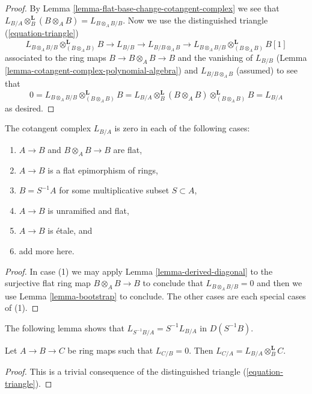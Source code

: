 \begin{proof}
By Lemma \ref{lemma-flat-base-change-cotangent-complex} we see that
$L_{B/A} \otimes_B^\mathbf{L} (B \otimes_A B) = L_{B \otimes_A B/B}$.
Now we use the distinguished triangle (\ref{equation-triangle})
$$
L_{B \otimes_A B/B} \otimes^\mathbf{L}_{(B \otimes_A B)} B \to
L_{B/B} \to L_{B/B \otimes_A B} \to
L_{B \otimes_A B/B} \otimes^\mathbf{L}_{(B \otimes_A B)} B[1]
$$
associated to the ring maps $B \to B \otimes_A B \to B$ and the vanishing of
$L_{B/B}$ (Lemma \ref{lemma-cotangent-complex-polynomial-algebra}) and
$L_{B/B \otimes_A B}$ (assumed) to see that
$$
0 =
L_{B \otimes_A B/B} \otimes^\mathbf{L}_{(B \otimes_A B)} B =
L_{B/A} \otimes_B^\mathbf{L} (B \otimes_A B)
\otimes^\mathbf{L}_{(B \otimes_A B)} B = L_{B/A}
$$
as desired.
\end{proof}

\begin{lemma}
\label{lemma-when-zero}
The cotangent complex $L_{B/A}$ is zero in each of the following cases:
\begin{enumerate}
\item $A \to B$ and $B \otimes_A B \to B$ are flat,
\item $A \to B$ is a flat epimorphism of rings,
\item $B = S^{-1}A$ for some multiplicative subset $S \subset A$,
\item $A \to B$ is unramified and flat,
\item $A \to B$ is \'etale, and
\item add more here.
\end{enumerate}
\end{lemma}

\begin{proof}
In case (1) we may apply
Lemma \ref{lemma-derived-diagonal}
to the surjective flat ring map $B \otimes_A B \to B$
to conclude that $L_{B \otimes_A B/B} = 0$ and then we use
Lemma \ref{lemma-bootstrap}
to conclude. The other cases are each special cases of (1).
\end{proof}

\noindent
The following lemma shows that $L_{S^{-1}B/A} = S^{-1}L_{B/A}$
in $D(S^{-1}B)$.

\begin{lemma}
\label{lemma-localize-on-top}
Let $A \to B \to C$ be ring maps such that $L_{C/B} = 0$.
Then $L_{C/A} = L_{B/A} \otimes_B^\mathbf{L} C$.
\end{lemma}

\begin{proof}
This is a trivial consequence of 
the distinguished triangle (\ref{equation-triangle}).
\end{proof}





